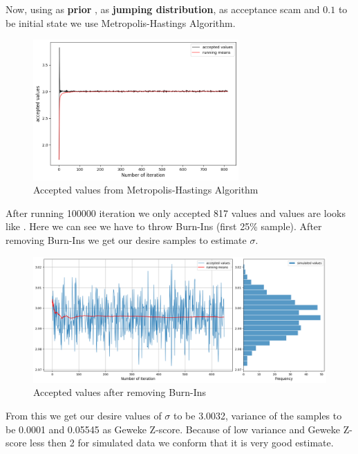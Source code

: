 \begin{example}
    Now, using  as \textbf{prior} ,  as \textbf{jumping distribution},  as acceptance scam and $0.1$ to be initial state we use Metropolis-Hastings Algorithm. 
    
    \begin{figure}[H]
        \centering
        \includegraphics[width=0.7\textwidth]{images/metropolis/example2/values.png}
        \caption{Accepted values from Metropolis-Hastings Algorithm}
        \label{fig:example2 values}
    \end{figure}

    After running 100000 iteration we only accepted 817 values and values are looks like . Here we can see we have to throw Burn-Ins (first 25\% sample). After removing Burn-Ins we get our desire samples to estimate $ \sigma $. 

    \begin{figure}[H]
        \centering
        \includegraphics[width=1\textwidth]{images/metropolis/example2/values-after-burnin.png}
        \caption{Accepted values after removing Burn-Ins}
    \end{figure}

    From this we get our desire values of $ \sigma $ to be 3.0032, variance of the samples to be 0.0001 and 0.05545 as Geweke Z-score. Because of low variance and Geweke Z-score less then 2 for simulated data we conform that it is very good estimate.


\end{example}
